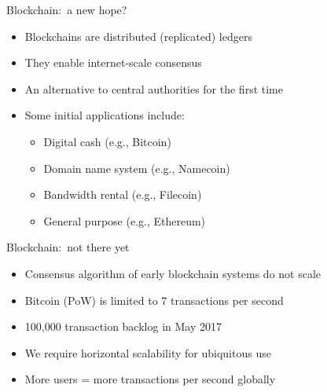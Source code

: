\documentclass{beamer}
\begin{document}
\begin{frame}{Blockchain:~a new hope?}
  \begin{itemize}
    \item Blockchains are distributed (replicated) ledgers
    \item They enable internet-scale consensus
    \item An alternative to central authorities for the first time
    \item Some initial applications include:
    \begin{itemize}
      \item Digital cash (e.g., Bitcoin)
      \item Domain name system (e.g., Namecoin)
      \item Bandwidth rental (e.g., Filecoin)
      \item General purpose (e.g., Ethereum)
    \end{itemize}
  \end{itemize}
\end{frame}

\begin{frame}{Blockchain:~not there yet}
  \begin{itemize}
    \item Consensus algorithm of early blockchain systems do not scale
    \item Bitcoin (PoW) is limited to 7 transactions per second
    \item 100,000 transaction backlog in May 2017
    \item We require horizontal scalability for ubiquitous use
    \item More users = more transactions per second globally
  \end{itemize}
\end{frame}
\end{document}
